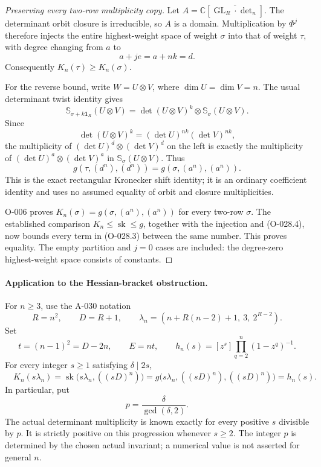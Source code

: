 \begin{proof}[Preserving every two-row multiplicity copy]
Let \(A=\mathbb C[\overline{\operatorname{GL}_R\cdot\det_n}]\).
The determinant orbit closure is irreducible, so \(A\) is a
domain. Multiplication by \(\Phi^j\) therefore injects the
entire highest-weight space of weight \(\sigma\) into that
of weight \(\tau\), with degree changing from \(a\) to
\[
                         a+je=a+nk=d.
\]
Consequently \(K_n(\tau)\geq K_n(\sigma)\).

For the reverse bound, write \(W=U\otimes V\), where
\(\dim U=\dim V=n\). The usual determinant twist identity gives
\[
 \mathbb S_{\sigma+k\mathbf1_R}(U\otimes V)
   =\det(U\otimes V)^k\otimes\mathbb S_\sigma(U\otimes V).
\]
Since
\[
 \det(U\otimes V)^k=(\det U)^{nk}(\det V)^{nk},
\]
the multiplicity of
\((\det U)^d\otimes(\det V)^d\) on the left is exactly the
multiplicity of
\((\det U)^a\otimes(\det V)^a\) in
\(\mathbb S_\sigma(U\otimes V)\). Thus
\[
                 g(\tau,(d^n),(d^n))
                      =g(\sigma,(a^n),(a^n)).
                                                               \tag{O-028.4}
\]
This is the exact rectangular Kronecker shift identity;
it is an ordinary coefficient identity and uses no
assumed equality of orbit and closure multiplicities.

O-006 proves \(K_n(\sigma)=g(\sigma,(a^n),(a^n))\) for
every two-row \(\sigma\). The established comparison
\(K_n\leq\operatorname{sk}\leq g\), together with the
injection and (O-028.4), now bounds every term in
(O-028.3) between the same number. This proves equality.
The empty partition and \(j=0\) cases are included:
the degree-zero highest-weight space consists of constants.
\end{proof}

\paragraph{Application to the Hessian-bracket obstruction.}
For \(n\geq3\), use the A-030 notation
\[
 R=n^2,\qquad D=R+1,\qquad
 \lambda_n=(n+R(n-2)+1,\ 3,\ 2^{R-2}).
                                                               \tag{O-028.5}
\]
Set
\[
       t=(n-1)^2=D-2n,\qquad E=nt,\qquad
       h_n(s)=[z^s]\prod_{q=2}^{n}(1-z^q)^{-1}.
                                                               \tag{O-028.6}
\]
For every integer \(s\geq1\) satisfying \(\delta\mid2s\),
\[
 \boxed{\quad
       K_n(s\lambda_n)
       =\operatorname{sk}\bigl(s\lambda_n,((sD)^n)\bigr)
       =g\bigl(s\lambda_n,((sD)^n),((sD)^n)\bigr)
       =h_n(s).
 \quad}                                                       \tag{O-028.7}
\]
In particular, put
\[
                            p=\frac{\delta}{\gcd(\delta,2)}.
\]
The actual determinant multiplicity is known exactly for
every positive \(s\) divisible by \(p\). It is strictly
positive on this progression whenever \(s\geq2\).
The integer \(p\) is determined by the chosen actual
invariant; a numerical value is not asserted for general \(n\).

